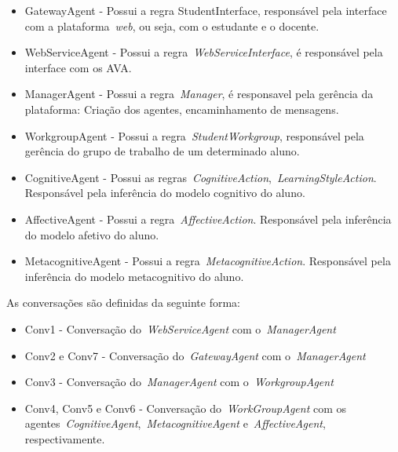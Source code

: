 \begin{itemize}
	\item GatewayAgent - Possui a regra StudentInterface, responsável pela interface com a plataforma~\emph{web}, ou seja, com o estudante e o docente.
	\item WebServiceAgent - Possui a regra~\emph{WebServiceInterface}, é responsável pela interface com os AVA.
	\item ManagerAgent - Possui a regra~\emph{Manager}, é responsavel pela gerência da plataforma: Criação dos agentes, encaminhamento de mensagens.
	\item WorkgroupAgent - Possui a regra~\emph{StudentWorkgroup}, responsável pela gerência do grupo de trabalho de um determinado aluno.
	\item CognitiveAgent - Possui as regras~\emph{CognitiveAction},~\emph{LearningStyleAction}. Responsável pela inferência do modelo cognitivo do aluno.
	\item AffectiveAgent - Possui a regra~\emph{AffectiveAction}. Responsável pela inferência do modelo afetivo do aluno.
	\item MetacognitiveAgent - Possui a regra~\emph{MetacognitiveAction}. Responsável pela inferência do modelo metacognitivo do aluno.
\end{itemize}

As conversações são definidas da seguinte forma:
\begin{itemize}
	\item Conv1 - Conversação do~\emph{WebServiceAgent} com o~\emph{ManagerAgent}
	\item Conv2 e Conv7 - Conversação do~\emph{GatewayAgent} com o~\emph{ManagerAgent}
	\item Conv3 - Conversação do~\emph{ManagerAgent} com o~\emph{WorkgroupAgent}
	\item Conv4, Conv5 e Conv6 - Conversação do~\emph{WorkGroupAgent} com os agentes~\emph{CognitiveAgent},~\emph{MetacognitiveAgent} e~\emph{AffectiveAgent}, respectivamente.
\end{itemize}

